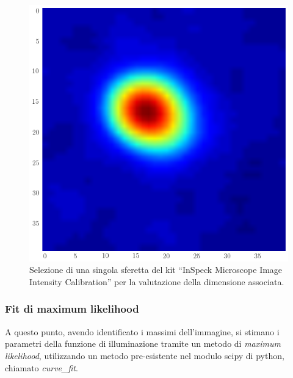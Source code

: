 \begin{figure}
 \centering
 \includegraphics[scale=.25]{img/CAP3punto.png}
 \caption{\small{Selezione di una singola sferetta del kit ``InSpeck Microscope Image Intensity Calibration'' per la valutazione della dimensione associata.}}
 \label{fig:punto}
\end{figure}

\subsubsection*{Fit di maximum likelihood}

A questo punto, avendo identificato i massimi dell'immagine, si stimano i parametri della funzione di illuminazione tramite un metodo di \textit{maximum likelihood}, utilizzando un metodo pre-esistente nel modulo scipy di python, chiamato \textit{curve\_fit}.

